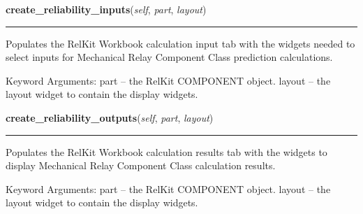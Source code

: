     \label{reliafree:relays:relay:Mechanical:create_reliability_inputs}

    \vspace{0.5ex}

\hspace{.8\funcindent}\begin{boxedminipage}{\funcwidth}

    \raggedright \textbf{create\_reliability\_inputs}(\textit{self}, \textit{part}, \textit{layout})

    \vspace{-1.5ex}

    \rule{\textwidth}{0.5\fboxrule}
\setlength{\parskip}{2ex}
    Populates the RelKit Workbook calculation input tab with the widgets
    needed to select inputs for Mechanical Relay Component Class prediction
    calculations.

    Keyword Arguments: part   -- the RelKit COMPONENT object. layout -- 
    the layout widget to contain the display widgets.

\setlength{\parskip}{1ex}
    \end{boxedminipage}

    \label{reliafree:relays:relay:Mechanical:create_reliability_outputs}

    \vspace{0.5ex}

\hspace{.8\funcindent}\begin{boxedminipage}{\funcwidth}

    \raggedright \textbf{create\_reliability\_outputs}(\textit{self}, \textit{part}, \textit{layout})

    \vspace{-1.5ex}

    \rule{\textwidth}{0.5\fboxrule}
\setlength{\parskip}{2ex}
    Populates the RelKit Workbook calculation results tab with the 
    widgets to display Mechanical Relay Component Class calculation 
    results.

    Keyword Arguments: part   -- the RelKit COMPONENT object. layout -- 
    the layout widget to contain the display widgets.

\setlength{\parskip}{1ex}
    \end{boxedminipage}

